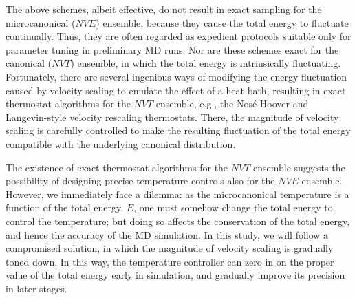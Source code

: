 \documentclass[reprint]{revtex4-1}
\begin{document}
The above schemes, albeit effective,
do not result in exact sampling for the microcanonical ($NVE$) ensemble\cite{hermansson1988},
because they cause the total energy to fluctuate continually.
%
Thus, they are often regarded as expedient protocols
suitable only for parameter tuning in preliminary MD runs.
%
Nor are these schemes exact for the canonical ($NVT$) ensemble,
in which the total energy is intrinsically fluctuating.
%
Fortunately, there are several ingenious ways
of modifying the energy fluctuation caused by velocity scaling
to emulate the effect of a heat-bath,
resulting in exact thermostat algorithms for the $NVT$ ensemble,
e.g., the Nos\'e-Hoover\cite{nose1984, nose1984mp, hoover1985, martyna1992}
and Langevin-style velocity rescaling\cite{bussi2007} thermostats.
%
There,
the magnitude of velocity scaling is carefully
controlled to make
the resulting fluctuation of the total energy
compatible with the underlying canonical distribution.


The existence of exact thermostat algorithms for the $NVT$ ensemble
suggests the possibility of designing
precise temperature controls also
for the $NVE$ ensemble.
%
However, we immediately face a dilemma:
%
as the microcanonical temperature is a function of the total energy, $E$,
one must somehow change the total energy to control the temperature;
%
but doing so affects the conservation of the total energy,
and hence the accuracy of the MD simulation\cite{hermansson1988}.
%
In this study, we will follow a compromised solution,
in which the magnitude of velocity scaling is gradually toned down.
%
In this way,
the temperature controller can
zero in on
the proper value of the total energy
early in simulation,
and gradually improve its precision
in later stages.
\end{document}

